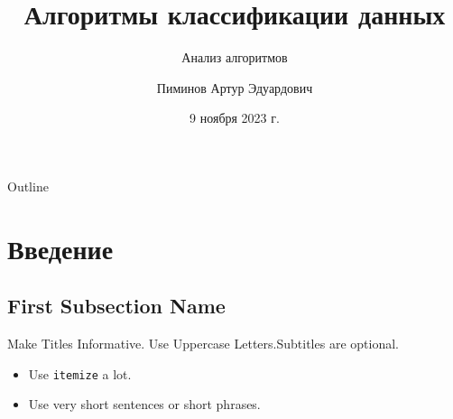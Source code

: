 \documentclass{beamer}
\title[Short Paper Title] %
{Алгоритмы классификации данных}
\subtitle
{Анализ алгоритмов} %
\author[Пиминов А.Э.] %
{Пиминов Артур Эдуардович}
\institute[Universities of Somewhere and Elsewhere] %
{
  Группа 23224\\
  Факультет информационных технологий\\
  Новосибирский государственный университет
}
\date[Short Occasion] %
{9 ноября 2023 г.}
\begin{document}
\begin{frame}
  \titlepage
\end{frame}

\begin{frame}{Outline}
  \tableofcontents
\end{frame}




\section{Введение}

\subsection[Short First Subsection Name]{First Subsection Name}

\begin{frame}{Make Titles Informative. Use Uppercase Letters.}{Subtitles are optional.}

  \begin{itemize}
    \item
      Use \texttt{itemize} a lot.
    \item
      Use very short sentences or short phrases.
  \end{itemize}
\end{frame}
\end{document}
